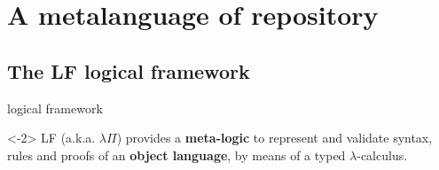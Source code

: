 \documentclass[ignorenonframetext,red]{beamer}
\begin{document}
\section{A metalanguage of repository}

\subsection{The LF logical framework}

\begin{frame}{ logical framework }
  \begin{onlyenv}<-2>
    LF  (a.k.a. $\lambda\Pi$) provides a {\bf
      meta-logic} to represent and validate syntax, rules and proofs
    of an \textbf{object language}, by means of a typed
    $\lambda$-calculus.


\end{onlyenv}
\end{frame}
\end{document}

